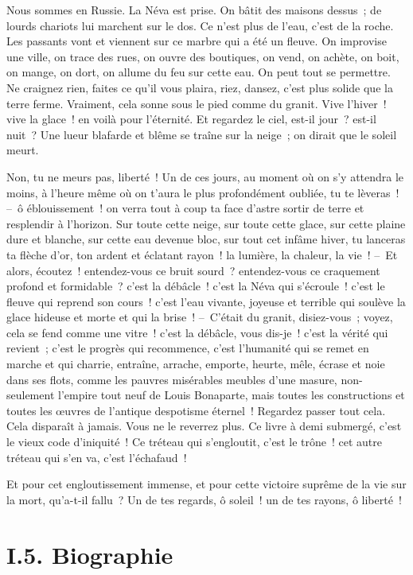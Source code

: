 \documentclass[french,twoside]{book} %
\begin{document}
\noindent Nous sommes en Russie. La Néva est prise. On bâtit des maisons dessus ; de lourds chariots lui marchent sur le dos. Ce n’est plus de l’eau, c’est de la roche. Les passants vont et viennent sur ce marbre qui a été un fleuve. On improvise une ville, on trace des rues, on ouvre des boutiques, on vend, on achète, on boit, on mange, on dort, on allume du feu sur cette eau. On peut tout se permettre. Ne craignez rien, faites ce qu’il vous plaira, riez, dansez, c’est plus solide que la terre ferme. Vraiment, cela sonne sous le pied comme du granit. Vive l’hiver ! vive la glace ! en voilà pour l’éternité. Et regardez le ciel, est-il jour ? est-il nuit ? Une lueur blafarde et blême se traîne sur la neige ; on dirait que le soleil meurt.\par
Non, tu ne meurs pas, liberté ! Un de ces jours, au moment où on s’y attendra le moins, à l’heure même où on t’aura le plus profondément oubliée, tu te lèveras ! – ô éblouissement ! on verra tout à coup ta face d’astre sortir de terre et resplendir à l’horizon. Sur toute cette neige, sur toute cette glace, sur cette plaine dure et blanche, sur cette eau devenue bloc, sur tout cet infâme hiver, tu lanceras ta flèche d’or, ton ardent et éclatant rayon ! la lumière, la chaleur, la vie ! – Et alors, écoutez ! entendez-vous ce bruit sourd ? entendez-vous ce craquement profond et formidable ? c’est la débâcle ! c’est la Néva qui s’écroule ! c’est le fleuve qui reprend son cours ! c’est l’eau vivante, joyeuse et terrible qui soulève la glace hideuse et morte et qui la brise ! – C’était du granit, disiez-vous ; voyez, cela se fend comme une vitre ! c’est la débâcle, vous dis-je ! c’est la vérité qui revient ; c’est le progrès qui recommence, c’est l’humanité qui se remet en marche et qui charrie, entraîne, arrache, emporte, heurte, mêle, écrase et noie dans ses flots, comme les pauvres misérables meubles d’une masure, non-seulement l’empire tout neuf de Louis Bonaparte, mais toutes les constructions et toutes les œuvres de l’antique despotisme éternel ! Regardez passer tout cela. Cela disparaît à jamais. Vous ne le reverrez plus. Ce livre à demi submergé, c’est le vieux code d’iniquité ! Ce tréteau qui s’engloutit, c’est le trône ! cet autre tréteau qui s’en va, c’est l’échafaud !\par
Et pour cet engloutissement immense, et pour cette victoire suprême de la vie sur la mort, qu’a-t-il fallu ? Un de tes regards, ô soleil ! un de tes rayons, ô liberté !

\section[{I.5. Biographie}]{I.5. Biographie}
\end{document}
